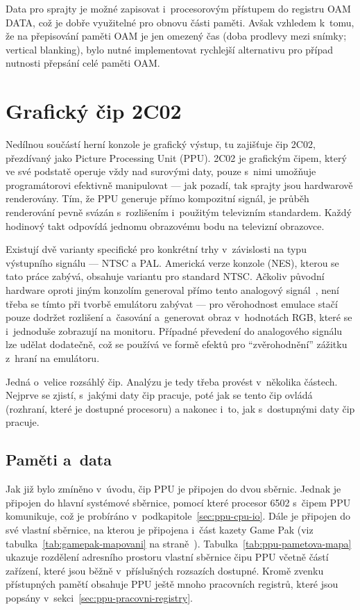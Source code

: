 \begin{note}
	Data pro sprajty je možné zapisovat i~procesorovým přístupem do registru OAM DATA, což je dobře využitelné pro obnovu části paměti. Avšak vzhledem k~tomu, že na přepisování paměti OAM je jen omezený čas (doba prodlevy mezi snímky; vertical blanking), bylo nutné implementovat rychlejší alternativu pro případ nutnosti přepsání celé paměti OAM.
\end{note}

\section{Grafický čip 2C02}
Nedílnou součástí herní konzole je grafický výstup, tu zajišťuje čip 2C02, přezdívaný jako Picture Processing Unit (PPU). 2C02 je grafickým čipem, který ve své podstatě operuje vždy nad surovými daty, pouze s~nimi umožňuje programátorovi efektivně manipulovat --- jak pozadí, tak sprajty jsou hardwarově renderovány. Tím, že PPU generuje přímo kompozitní signál, je průběh renderování pevně svázán s~rozlišením i~použitým televizním standardem. Každý hodinový takt odpovídá jednomu obrazovému bodu na televizní obrazovce.

Existují dvě varianty specifické pro konkrétní trhy v~závislosti na typu výstupního signálu --- NTSC a PAL. Americká verze konzole (NES), kterou se tato práce zabývá, obsahuje variantu pro standard NTSC. Ačkoliv původní hardware oproti jiným konzolím generoval přímo tento analogový signál~\cite{Nesdev:ntsc}, není třeba se tímto při tvorbě emulátoru zabývat --- pro věrohodnost emulace stačí pouze dodržet rozlišení a~časování a~generovat obraz v~hodnotách RGB, které se i~jednoduše zobrazují na monitoru. Případné převedení do analogového signálu lze udělat dodatečně, což se používá ve formě efektů pro \enquote{zvěrohodnění} zážitku z~hraní na emulátoru.

Jedná o~velice rozsáhlý čip. Analýzu je tedy třeba provést v~několika částech. Nejprve se zjistí, s~jakými daty čip pracuje, poté jak se tento čip ovládá (rozhraní, které je dostupné procesoru) a nakonec i~to, jak s~dostupnými daty čip pracuje.

\subsection{Paměti a~data}
Jak již bylo zmíněno v~úvodu, čip PPU je připojen do dvou sběrnic. Jednak je připojen do hlavní systémové sběrnice, pomocí které procesor 6502 s~čipem PPU komunikuje, což je probíráno v~podkapitole~\ref{sec:ppu-cpu-io}. Dále je připojen do své vlastní sběrnice, na kterou je připojena i~část kazety Game Pak (viz tabulka~\ref{tab:gamepak-mapovani} na straně~\pageref{tab:gamepak-mapovani}). Tabulka~\ref{tab:ppu-pametova-mapa} ukazuje rozdělení adresního prostoru vlastní sběrnice čipu PPU včetně částí zařízení, které jsou běžně v~příslušných rozsazích dostupné. Kromě zvenku přístupných pamětí obsahuje PPU ještě mnoho pracovních registrů, které jsou popsány v~sekci~\ref{sec:ppu-pracovni-registry}.

